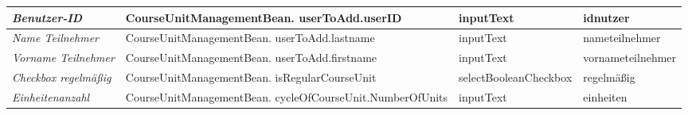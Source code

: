 \begin{itemize}
\begin{center}
\begin{longtable}{|p{3cm} |p{6cm} | p{4cm}|p{3cm}|}
						\textit{Benutzer-ID} & CourseUnitManagementBean. userToAdd.userID & inputText & idnutzer \\ \hline
						\textit{Name Teilnehmer} & CourseUnitManagementBean. userToAdd.lastname & inputText & nameteilnehmer \\ \hline
						\textit{Vorname Teilnehmer} & CourseUnitManagementBean. userToAdd.firstname & inputText & vornameteilnehmer \\ \hline
						\textit{Checkbox regelmäßig} & CourseUnitManagementBean. isRegularCourseUnit & selectBooleanCheckbox & regelmäßig \\ \hline
						\textit{Einheitenanzahl} & CourseUnitManagementBean. cycleOfCourseUnit.NumberOfUnits & inputText & einheiten \\ \hline
					\end{longtable}
				\end{center}
				
				\begin{center}
					\begin{longtable}{|p{3cm} |p{8cm} | p{5cm}|}
						

\end{longtable}
\end{center}
\end{itemize}
